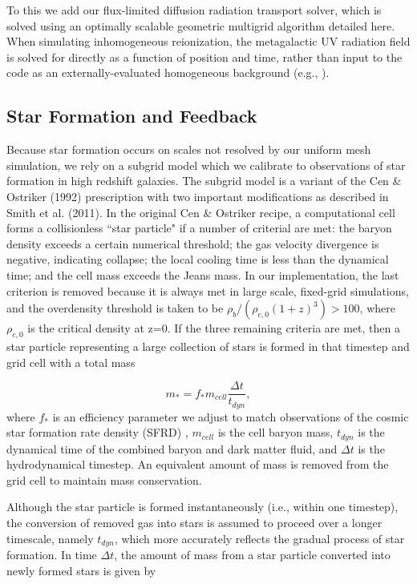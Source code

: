 To this we add our flux-limited diffusion radiation transport solver, which is solved using an optimally scalable geometric multigrid algorithm detailed here. When simulating inhomogeneous reionization, the metagalactic UV radiation field is solved for directly as a function of position and time, rather than input to the code as an externally-evaluated homogeneous background (e.g., \cite{HaardtMadau2012}). 

\subsection{Star Formation and Feedback}
\label{subsec:starform}

Because star formation occurs on scales not resolved by our uniform mesh simulation, 
we rely on a subgrid model which we calibrate to observations of star formation in high
redshift galaxies. The subgrid model is a variant of the Cen \& Ostriker (1992)
prescription with two important modifications as described in Smith et al. (2011). In the original Cen \& Ostriker recipe, a computational cell forms a collisionless ``star particle" if a number of criterial are met: the baryon density exceeds a certain numerical threshold; the gas velocity divergence is negative, indicating collapse; the local cooling time is less than the dynamical time; and the cell mass exceeds the Jeans mass. In our implementation, the last criterion is removed because it is always met in large scale, fixed-grid simulations, and the overdensity threshold is taken to be $\rho_b/(\rho_{c,0}(1+z)^3) > 100$, where $\rho_{c,0}$ is the critical density at z=0. If the three remaining criteria are met, then a star particle representing a large collection of stars is formed in that timestep and grid cell with a total mass

\begin{equation}
m_* = f_* m_{cell} \frac{\Delta t}{t_{dyn}},
\end{equation}
where $f_*$ is an efficiency parameter we adjust to match observations of the cosmic star formation rate density (SFRD) \citep{Bouwens11}, $m_{cell}$ is the cell baryon mass, $t_{dyn}$ is the dynamical time of the combined baryon and dark matter fluid, and $\Delta t$ is the hydrodynamical timestep. An equivalent amount of mass is removed from the grid cell to maintain mass conservation. 

Although the star particle is formed instantaneously (i.e., within one timestep), the conversion of removed gas into stars is assumed to proceed over a longer timescale, namely $t_{dyn}$, which more accurately reflects the gradual process of star formation. In time $\Delta t$, the amount 
of mass from a star particle converted into newly formed stars is given by

